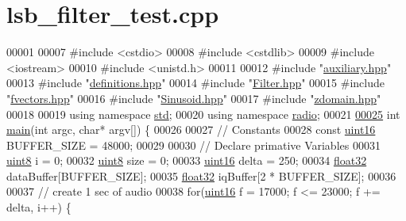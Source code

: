 \hypertarget{lsb__filter__test_8cpp_source}{\section{lsb\+\_\+filter\+\_\+test.\+cpp}
\label{lsb__filter__test_8cpp_source}
}

\begin{DoxyCode}
00001 
00007 \textcolor{preprocessor}{#include <cstdio>}
00008 \textcolor{preprocessor}{#include <cstdlib>}
00009 \textcolor{preprocessor}{#include <iostream>}
00010 \textcolor{preprocessor}{#include <unistd.h>}
00011 
00012 \textcolor{preprocessor}{#include "\hyperlink{auxiliary_8hpp}{auxiliary.hpp}"}
00013 \textcolor{preprocessor}{#include "\hyperlink{definitions_8hpp}{definitions.hpp}"}
00014 \textcolor{preprocessor}{#include "\hyperlink{Filter_8hpp}{Filter.hpp}"}
00015 \textcolor{preprocessor}{#include "\hyperlink{fvectors_8hpp}{fvectors.hpp}"}
00016 \textcolor{preprocessor}{#include "\hyperlink{Sinusoid_8hpp}{Sinusoid.hpp}"}
00017 \textcolor{preprocessor}{#include "\hyperlink{zdomain_8hpp}{zdomain.hpp}"}
00018 
00019 \textcolor{keyword}{using namespace }\hyperlink{namespacestd}{std};
00020 \textcolor{keyword}{using namespace }\hyperlink{namespaceradio}{radio};
00021 
\hypertarget{lsb__filter__test_8cpp_source_l00025}{}\hyperlink{lsb__filter__test_8cpp_a0ddf1224851353fc92bfbff6f499fa97}{00025} \textcolor{keywordtype}{int} \hyperlink{lsb__filter__test_8cpp_a0ddf1224851353fc92bfbff6f499fa97}{main}(\textcolor{keywordtype}{int} argc, \textcolor{keywordtype}{char}* argv[]) \{
00026 
00027     \textcolor{comment}{// Constants}
00028     \textcolor{keyword}{const} \hyperlink{definitions_8hpp_a05f6b0ae8f6a6e135b0e290c25fe0e4e}{uint16} BUFFER\_SIZE = 48000;
00029 
00030     \textcolor{comment}{// Declare primative Variables}
00031     \hyperlink{definitions_8hpp_adde6aaee8457bee49c2a92621fe22b79}{uint8} i = 0;
00032     \hyperlink{definitions_8hpp_adde6aaee8457bee49c2a92621fe22b79}{uint8} size = 0;
00033     \hyperlink{definitions_8hpp_a05f6b0ae8f6a6e135b0e290c25fe0e4e}{uint16} delta = 250;
00034     \hyperlink{definitions_8hpp_aacdc525d6f7bddb3ae95d5c311bd06a1}{float32} dataBuffer[BUFFER\_SIZE];
00035     \hyperlink{definitions_8hpp_aacdc525d6f7bddb3ae95d5c311bd06a1}{float32} iqBuffer[2 * BUFFER\_SIZE];
00036 
00037     \textcolor{comment}{// create 1 sec of audio}
00038     \textcolor{keywordflow}{for}(\hyperlink{definitions_8hpp_a05f6b0ae8f6a6e135b0e290c25fe0e4e}{uint16} f = 17000; f <= 23000; f += delta, i++) \{

\end{DoxyCode}
